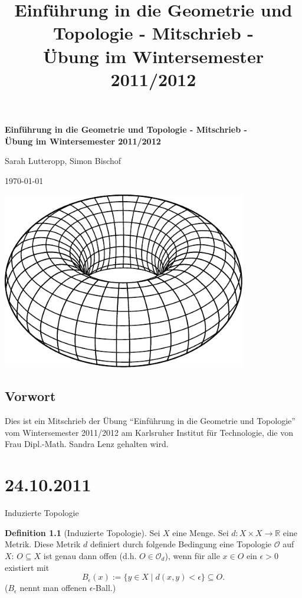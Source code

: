 \documentclass[a4paper,11pt,notitlepage]{report}
\title{\textbf{{Einführung in die Geometrie und Topologie - Mitschrieb -} \\[5ex] 
    {\Large Übung im Wintersemester 2011/2012\\[5ex]}}}
\author{\myname{Sarah Lutteropp, Simon Bischof}}
\theoremstyle{definition}
\newtheorem{definition}{Definition}[chapter]
\newcommand{\R}{{\ensuremath{\mathbb{R}}}}
\newcommand{\OO}{{\ensuremath{\mathcal{O}}}}
\begin{document}
\begin{titlepage}
	\begin{center}	
		\LARGE \textbf{{Einführung in die Geometrie und Topologie - Mitschrieb -} \\[5ex] 
    		{\Large Übung im Wintersemester 2011/2012\\[5ex]}}
	\end{center}
	\begin{center}
		\Large Sarah Lutteropp, Simon Bischof
	\end{center}
	\begin{center}
		\today
	\end{center}
	\vspace{2cm}
	\begin{center}
		\includegraphics[width=0.8\textwidth]{torus2.pdf}
	\end{center}
\end{titlepage}
\setcounter{tocdepth}{1}
\tableofcontents

\section*{Vorwort}
Dies ist ein Mitschrieb der Übung “Einführung in die Geometrie und Topologie” vom Wintersemester 2011/2012 am Karlsruher Institut für Technologie, die von Frau Dipl.-Math. Sandra Lenz gehalten wird.

\chapter{24.10.2011}

\begin{section}{Induzierte Topologie}
	\begin{definition}[Induzierte Topologie]
		Sei $X$ eine Menge. Sei $d \colon X \times X \rightarrow \R$ eine Metrik. Diese Metrik $d$ definiert durch folgende Bedingung eine Topologie $\OO$ auf $X$:
		\newline
		$O \subseteq X$ ist genau dann offen (d.h. $O \in \OO_d$), wenn für alle $x \in O$ ein $\epsilon > 0$ existiert mit
		$$
			B_\epsilon (x) := \{y \in X \mid d(x,y) < \epsilon\} \subseteq O.
		$$
		($B_\epsilon$ nennt man offenen $\epsilon$-Ball.)
	\end{definition}
\end{section}
\end{document}
